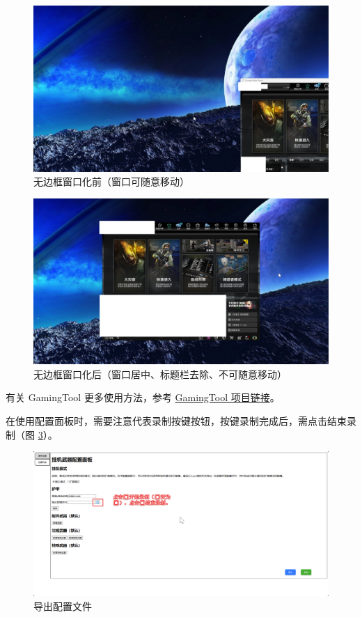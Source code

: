 \begin{figure}
    \Centering
    \includegraphics[width=\textwidth]{documents/assets/before-make-borderless.png}
    \caption{无边框窗口化前（窗口可随意移动）}
    \label{ch2fig-before-make-borderless}
\end{figure}

\begin{figure}
    \Centering
    \includegraphics[width=\textwidth]{documents/assets/after-make-borderless.png}
    \caption{无边框窗口化后（窗口居中、标题栏去除、不可随意移动）}
    \label{ch2fig-after-make-borderless}
\end{figure}

有关 GamingTool 更多使用方法，参考 \href{https://gitee.com/silver1867/gaming-tool}{GamingTool 项目链接}。

在使用配置面板时，需要注意️代表录制按键按钮，按键录制完成后，需点击结束录制（图 \ref{ch2fig-about-recording}）。

\begin{figure}[H]
    \Centering
    \includegraphics[width=\textwidth]{documents/assets/about_recording}
    \caption{导出配置文件}
    \label{ch2fig-about-recording}
\end{figure}

